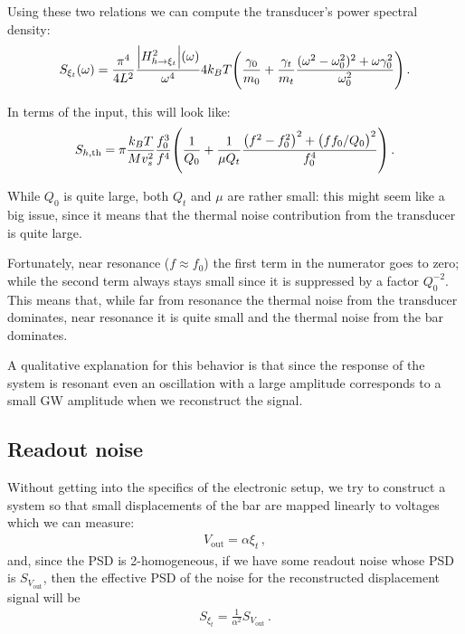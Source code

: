 \documentclass[main.tex]{subfiles}
\begin{document}
Using these two relations we can compute the transducer's power spectral density: 
%
\begin{align}
S_{\xi_{t}} (\omega ) = \frac{\pi^{4}}{4 L^{2}} 
\frac{\abs{H_{h \to \xi_{t}}^2} (\omega )}{\omega^{4}} 
4 k_B T \qty(\frac{\gamma_0}{m_0 } + \frac{\gamma_{t}}{m_t} \frac{(\omega^2- \omega_0^2)^2 + \omega \gamma_0^2}{\omega_0^2})
\,.
\end{align}


In terms of the input, this will look like: 
%
\begin{align}
S _{h, \text{th}} = \pi \frac{k_B T}{M v_s^2} 
\frac{f_0^3}{f^{4}} \qty( \frac{1}{Q_0} + \frac{1}{\mu Q_t} \frac{\qty(f^2-f_0^2)^2 + \qty(f f_0 / Q_0 )^2}{f_0^{4}})
\,.
\end{align}

While \(Q_0 \) is quite large, both \(Q_t\) and \(\mu \) are rather small: this might seem like a big issue, since it means that the thermal noise contribution from the transducer is quite large. 

Fortunately, near resonance (\(f \approx f_0 \)) the first term in the numerator goes to zero; while the second term always stays small since it is suppressed by a factor \(Q_0^{-2}\).
This means that, while far from resonance the thermal noise from the transducer dominates, near resonance it is quite small and the thermal noise from the bar dominates.

A qualitative explanation for this behavior is that since the response of the system is resonant even an oscillation with a large amplitude corresponds to a small GW amplitude when we reconstruct the signal. 

\subsection{Readout noise}

Without getting into the specifics of the electronic setup, we try to construct a system so that small displacements of the bar are mapped linearly to voltages which we can measure: 
%
\begin{align}
V _{\text{out}} = \alpha \xi_{t}
\,,
\end{align}
%
and, since the PSD is 2-homogeneous, if we have some readout noise whose PSD is \(S_{V _{\text{out}}}\), then the effective PSD of the noise for the reconstructed displacement signal will be 
%
\begin{align}
S_{\xi_{t}} = \frac{1}{\alpha^2} S_{V _{\text{out}}}
\,.
\end{align}
\end{document}
